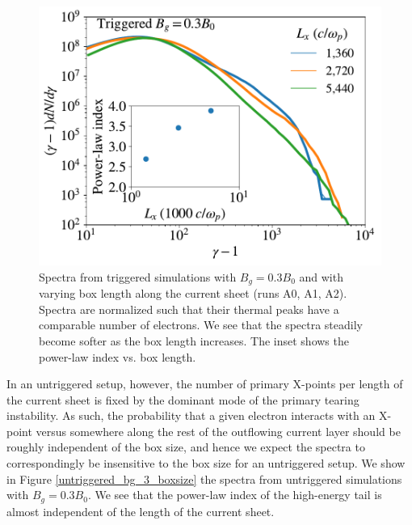 \begin{figure}[htp] 
	\includegraphics[width=\linewidth]{triggered_bguide_3_boxsize.pdf}
	\caption{Spectra from triggered simulations with $B_{g}=0.3B_{0}$ and with varying box length along the current sheet (runs A0, A1, A2).  Spectra are normalized such that their thermal peaks have a comparable number of electrons.  We see that the spectra steadily become softer as the box length increases.  The inset shows the power-law index vs. box length.}
	\label{triggered_bg_3_boxsize}
\end{figure}


In an untriggered setup, however, the number of primary X-points per length of the current sheet is fixed by the dominant mode of the primary tearing instability.  As such, the probability that a given electron interacts with an X-point versus somewhere along the rest of the outflowing current layer should be roughly independent of the box size, and hence we expect the spectra to correspondingly be insensitive to the box size for an untriggered setup.  We show in Figure \ref{untriggered_bg_3_boxsize} the spectra from untriggered simulations with $B_{g}=0.3B_{0}$.  We see that the power-law index of the high-energy tail is almost independent of the length of the current sheet.

